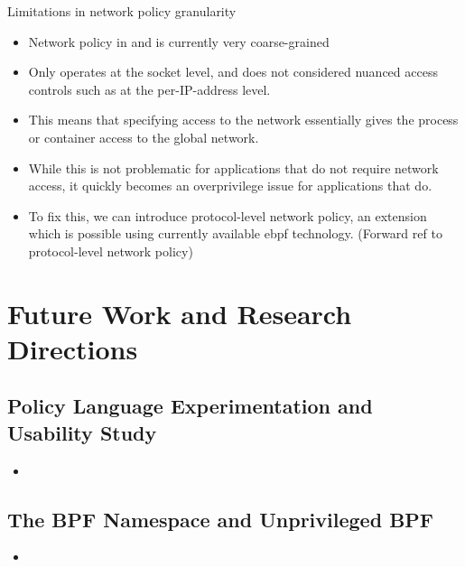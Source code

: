 \begin{inprogress}
  Limitations in network policy granularity
  \begin{itemize}
    \item Network policy in \bpfbox{} and \bpfcontain{} is currently very coarse-grained
    \item Only operates at the socket level, and does not considered nuanced access
    controls such as at the per-IP-address level.
    \item This means that specifying access to the network essentially gives the process or container
    access to the global network.
    \item While this is not problematic for applications that do not require network access,
    it quickly becomes an overprivilege issue for applications that do.
    \item To fix this, we can introduce protocol-level network policy, an extension which
    is possible using currently available \gls{ebpf} technology. (Forward ref to protocol-level network policy)
  \end{itemize}
\end{inprogress}


\section{Future Work and Research Directions}%
\label{s:disc-future-work}


\subsection{Policy Language Experimentation and Usability Study}

\begin{inprogress}
  \begin{itemize}
    \item
  \end{itemize}
\end{inprogress}

\subsection{The BPF Namespace and Unprivileged BPF}

\begin{inprogress}
  \begin{itemize}
    \item
  \end{itemize}
\end{inprogress}

